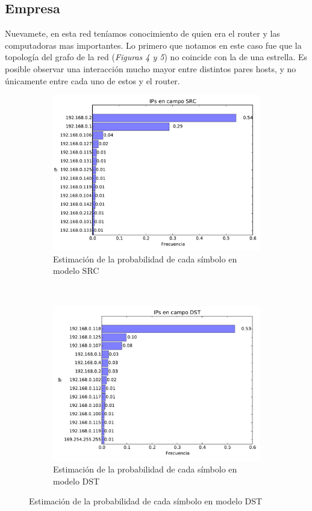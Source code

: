 \subsection{Empresa}

Nuevamete, en esta red teníamos conocimiento de quien era el router y las computadoras mas 
importantes. 
Lo primero que notamos en este caso fue que la topología del grafo de la red (\emph{Figuras 4 y 5})
no coincide con la de una estrella. Es posible observar una interacción mucho mayor 
entre distintos pares hosts, y no únicamente entre cada uno de estos y el router.

\begin{figure}[H]
	\center
	\begin{subfigure}{0.4\textwidth}
		\includegraphics[width=1.0\textwidth]{resultados/empresa/ipsSrc_2_05542931604.pdf}
		\caption{Estimaci\'on de la probabilidad de cada s\'imbolo en modelo SRC}
	\end{subfigure}
	~
	\begin{subfigure}{0.4\textwidth}
		\includegraphics[width=1.0\textwidth]{resultados/empresa/ipsDst_2_99926622579.pdf}
		\caption{Estimaci\'on de la probabilidad de cada s\'imbolo en modelo DST}
	\end{subfigure}
\end{figure}

